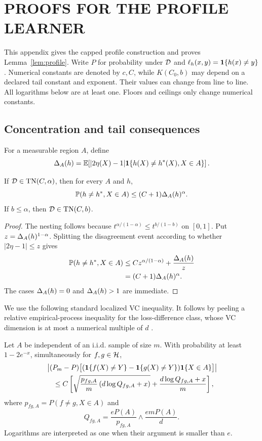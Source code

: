 \section{PROOFS FOR THE PROFILE LEARNER}
\label{app:profile}

This appendix gives the capped profile construction and proves Lemma~\ref{lem:profile}. Write $P$ for probability under $\mathcal D$ and $\ell_h(x,y)=\mathbf 1\{h(x)\ne y\}$. Numerical constants are denoted by $c,C$, while $K(C_0,b)$ may depend on a declared tail constant and exponent. Their values can change from line to line. All logarithms below are at least one. Floors and ceilings only change numerical constants.

\subsection{Concentration and tail consequences}

For a measurable region $A$, define
\[
 \Delta_A(h)=\mathbb E\!\left[|2\eta(X)-1|
 \mathbf 1\{h(X)\ne h^*(X),X\in A\}\right].
\]

\begin{lemma}
\label{lem:regional-appendix}
If $\mathcal D\in\mathrm{TN}(C,\alpha)$, then for every $A$ and $h$,
\[
 \mathbb P(h\ne h^*,X\in A)\leq(C+1)\Delta_A(h)^\alpha.
\]
If $b\leq\alpha$, then $\mathcal D\in\mathrm{TN}(C,b)$.
\end{lemma}

\begin{proof}
The nesting follows because $t^{\alpha/(1-\alpha)}\leq t^{b/(1-b)}$ on $[0,1]$. Put $z=\Delta_A(h)^{1-\alpha}$. Splitting the disagreement event according to whether $|2\eta-1|\leq z$ gives
\begin{align*}
 \mathbb P(h\ne h^*,X\in A)
 &\leq Cz^{\alpha/(1-\alpha)}+\frac{\Delta_A(h)}{z}\\
 &=(C+1)\Delta_A(h)^\alpha.
\end{align*}
The cases $\Delta_A(h)=0$ and $\Delta_A(h)>1$ are immediate.
\end{proof}

We use the following standard localized VC inequality. It follows by peeling a relative empirical-process inequality for the loss-difference class, whose VC dimension is at most a numerical multiple of $d$ \citep{gine2006concentration,koltchinskii2006local}.

\begin{lemma}
\label{lem:local-vc}
Let $A$ be independent of an i.i.d. sample of size $m$. With probability at least $1-2e^{-x}$, simultaneously for $f,g\in\mathcal H$,
\begin{align}
 &\left|(P_m-P)
 \bigl[(\mathbf 1\{f(X)\ne Y\}-\mathbf 1\{g(X)\ne Y\})\mathbf 1\{X\in A\}\bigr]\right|
 \nonumber\\
 &\quad\leq C\left[
 \sqrt{\frac{p_{fg,A}}{m}
 \left(d\log Q_{fg,A}+x\right)}
 +\frac{d\log Q_{fg,A}+x}{m}
 \right],
 \label{eq:local-vc}
\end{align}
where $p_{fg,A}=P(f\ne g,X\in A)$ and
\[
 Q_{fg,A}=\frac{eP(A)}{p_{fg,A}}
 \wedge\frac{emP(A)}d.
\]
Logarithms are interpreted as one when their argument is smaller than $e$.
\end{lemma}

